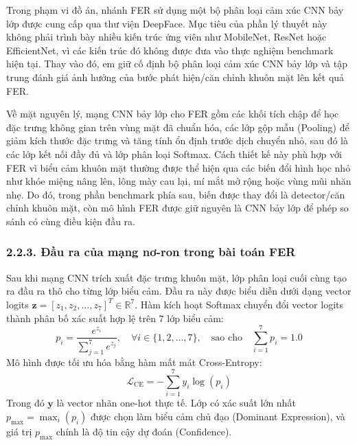 Trong phạm vi đồ án, nhánh FER sử dụng một bộ phân loại cảm xúc CNN bảy lớp được cung cấp qua thư viện DeepFace. Mục tiêu của phần lý thuyết này không phải trình bày nhiều kiến trúc ứng viên như MobileNet, ResNet hoặc EfficientNet, vì các kiến trúc đó không được đưa vào thực nghiệm benchmark hiện tại. Thay vào đó, em giữ cố định bộ phân loại cảm xúc CNN bảy lớp và tập trung đánh giá ảnh hưởng của bước phát hiện/căn chỉnh khuôn mặt lên kết quả FER.

Về mặt nguyên lý, mạng CNN bảy lớp cho FER gồm các khối tích chập để học đặc trưng không gian trên vùng mặt đã chuẩn hóa, các lớp gộp mẫu (Pooling) để giảm kích thước đặc trưng và tăng tính ổn định trước dịch chuyển nhỏ, sau đó là các lớp kết nối đầy đủ và lớp phân loại Softmax. Cách thiết kế này phù hợp với FER vì biểu cảm khuôn mặt thường được thể hiện qua các biến đổi hình học nhỏ như khóe miệng nâng lên, lông mày cau lại, mí mắt mở rộng hoặc vùng mũi nhăn nhẹ. Do đó, trong phần benchmark phía sau, biến được thay đổi là detector/căn chỉnh khuôn mặt, còn mô hình FER được giữ nguyên là CNN bảy lớp để phép so sánh có cùng điều kiện đầu ra.

\subsubsection*{2.2.3. Đầu ra của mạng nơ-ron trong bài toán FER}

Sau khi mạng CNN trích xuất đặc trưng khuôn mặt, lớp phân loại cuối cùng tạo ra đầu ra thô cho từng lớp biểu cảm. Đầu ra này được biểu diễn dưới dạng vector logits $\bm{z} = [z_1, z_2, \dots, z_7]^T \in \mathbb{R}^7$. Hàm kích hoạt Softmax chuyển đổi vector logits thành phân bố xác suất hợp lệ trên 7 lớp biểu cảm:
\begin{equation}
p_i = \frac{e^{z_i}}{\sum_{j=1}^{7} e^{z_j}}, \quad \forall i \in \{1, 2, \dots, 7\}, \quad \text{sao cho} \quad \sum_{i=1}^{7} p_i = 1.0
\end{equation}
Mô hình được tối ưu hóa bằng hàm mất mát Cross-Entropy:
\begin{equation}
\mathcal{L}_{\text{CE}} = - \sum_{i=1}^{7} y_i \log(p_i)
\end{equation}
Trong đó $\bm{y}$ là vector nhãn one-hot thực tế. Lớp có xác suất lớn nhất $p_{\text{max}} = \max_i(p_i)$ được chọn làm biểu cảm chủ đạo (Dominant Expression), và giá trị $p_{\text{max}}$ chính là độ tin cậy dự đoán (Confidence).

